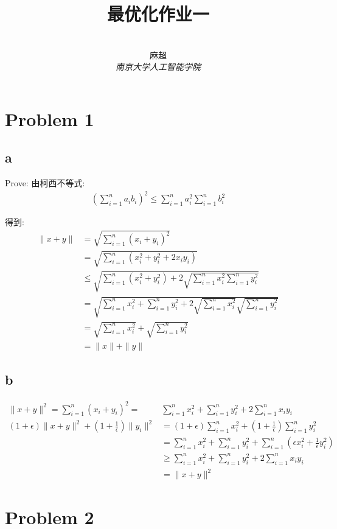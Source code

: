 \documentclass[12pt,a4paper,fontset=none]{ctexart}
\title{\textbf{最优化作业一}}
\author{
\\
\Large{麻超 \quad 201300066}
\\[6pt]
{ \large \textit{南京大学人工智能学院}}\\[2pt]
}
\begin{document}
\maketitle
\setcounter{page}{1}
\section*{Problem 1}
\subsection*{a}
Prove:
由柯西不等式:
\begin{align*}
    (\sum_{i=1}^{n}a_ib_i)^2\leq \sum_{i=1}^{n}a_i^2\sum_{i=1}^{n}b_i^2
\end{align*}

得到:
\begin{align*}
    \|x+y\| & =\sqrt{\sum_{i=1}^{n}(x_i+y_i)^2}
    \\&=\sqrt{\sum_{i=1}^{n}(x_i^2+y_i^2+2x_iy_i)}
    \\&\leq \sqrt{\sum_{i=1}^{n}(x_i^2+y_i^2)+2\sqrt{\sum_{i=1}^{n}x_i^2\sum_{i=1}^{n}y_i^2}}\\
            & =\sqrt{\sum_{i=1}^{n}x_i^2+\sum_{i=1}^{n}y_i^2+2\sqrt{\sum_{i=1}^{n}x_i^2}\sqrt{\sum_{i=1}^{n}y_i^2}} \\
            & =\sqrt{\sum_{i=1}^{n}x_i^2}+\sqrt{\sum_{i=1}^{n}y_i^2}                                                \\
            & =\|x\|+\|y\|
\end{align*}
\subsection*{b}
\begin{align*}
    \|x+y\|^2=\sum_{i=1}^{n}(x_i+y_i)^2=                   & \sum_{i=1}^{n}x_i^2+\sum_{i=1}^{n}y_i^2+2\sum_{i=1}^{n}x_iy_i               \\
    (1+\epsilon)\|x+y\|^2+(1+\frac{1}{\epsilon} )\|y_i\|^2 & =(1+\epsilon)\sum_{i=1}^{n}x_i^2+(1+\frac{1}{\epsilon} )\sum_{i=1}^{n}y_i^2 \\&=\sum_{i=1}^{n}x_i^2+\sum_{i=1}^{n}y_i^2+\sum_{i=1}^{n}(\epsilon x_i^2+\frac{1}{\epsilon}y_i^2 )\\&\geq \sum_{i=1}^{n}x_i^2+\sum_{i=1}^{n}y_i^2+2\sum_{i=1}^{n}x_iy_i\\&=\|x+y\|^2
\end{align*}

\section*{Problem 2}
\end{document}
